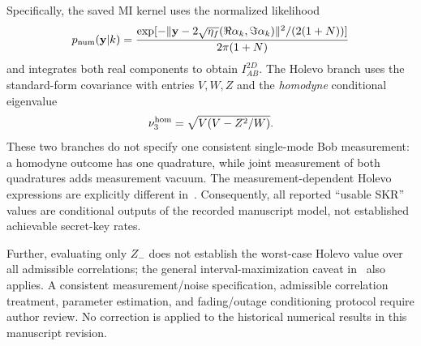Specifically, the saved MI kernel uses the normalized likelihood
\[
 p_{\rm num}(\mathbf y|k)=\frac{
 \exp[-\|\mathbf y-2\sqrt{\eta_f}(\Re\alpha_k,\Im\alpha_k)\|^2/
                 (2(1+N))]}{2\pi(1+N)}
\]
and integrates both real components to obtain $I_{AB}^{2D}$.
The Holevo branch uses the standard-form covariance with entries
$V,W,Z$ and the \emph{homodyne} conditional eigenvalue
\[
 \nu_3^{\rm hom}=\sqrt{V(V-Z^2/W)}.
\]
These two branches do not specify one consistent single-mode Bob
measurement: a homodyne outcome has one quadrature, while joint
measurement of both quadratures adds measurement vacuum. The
measurement-dependent Holevo expressions are explicitly different
in~\cite{denys2021}. Consequently, all reported ``usable SKR'' values
are conditional outputs of the recorded manuscript model, not
established achievable secret-key rates.

Further, evaluating only $Z_-$ does not establish the worst-case
Holevo value over all admissible correlations; the general
interval-maximization caveat in~\cite[Sec.~4, footnotes 11--12]{denys2021}
also applies. A consistent measurement/noise specification, admissible
correlation treatment, parameter estimation, and fading/outage
conditioning protocol require author review. No correction is applied
to the historical numerical results in this manuscript revision.

